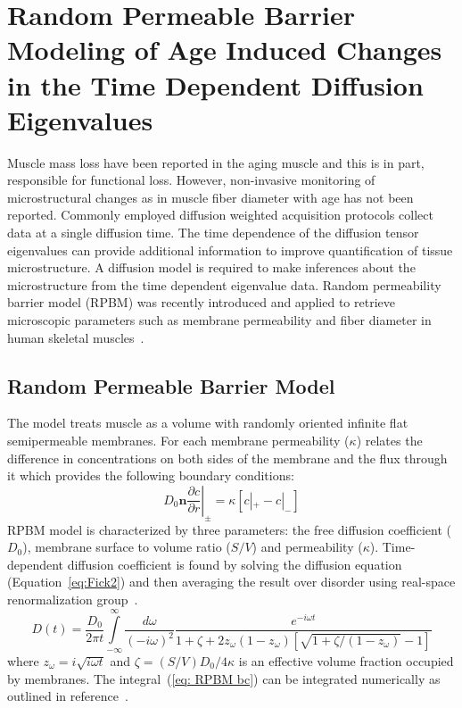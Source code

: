\section{Random Permeable Barrier Modeling of Age Induced Changes in the Time Dependent Diffusion Eigenvalues}
\label{sec: STEAM RPBM}
Muscle mass loss have been reported in the aging muscle and this is in part, responsible for functional loss. 
However, non-invasive monitoring of microstructural changes as in muscle fiber diameter with age has not been reported. 
Commonly employed diffusion weighted acquisition protocols collect data at a single diffusion time. 
The time dependence of the diffusion tensor eigenvalues can provide additional information to improve quantification of tissue microstructure. 
A diffusion model is required to make inferences about the microstructure from the time dependent eigenvalue data.
Random permeability barrier model (RPBM) was recently introduced and applied to retrieve microscopic parameters such as membrane permeability and fiber diameter in human skeletal muscles~\cite{NovikovRPBM, RND13}. 
\subsection{Random Permeable Barrier Model}
The model treats muscle as a volume with randomly oriented infinite flat semipermeable membranes. 
For each membrane permeability ($\kappa$) relates the difference in concentrations on both sides of the membrane and the flux through it which provides the following boundary conditions:
\begin{equation}\label{eq: RPBM bc}
D_0\mathbf{n}\left.\frac{\partial{c}}{\partial r} \right\vert_{\pm} = \kappa \left[ c|_+ - c|_-  \right]
\end{equation}
RPBM model is characterized by three parameters: the free diffusion coefficient ($D_0$), membrane surface to volume ratio ($S/V$) and permeability ($\kappa$). Time-dependent diffusion coefficient is found by solving the diffusion equation (Equation~\ref{eq:Fick2}) and then averaging the result over disorder using real-space renormalization group~\cite{NovikovRPBM}.
\begin{equation}\label{eq: RPBM}
D(t) = \frac{D_0}{2\pi t}\int\limits^{\infty}_{-\infty}\dfrac{d\omega}{(-i\omega)^2}\frac{e^{-i\omega t}}{1 + \zeta +2z_{\omega}(1-z_{\omega})  \left[\sqrt{1+\zeta/\left(1-z_{\omega}\right)}-1 \right] }
\end{equation}
where $z_\omega = i \sqrt{i \omega t}$ and $\zeta=(S/V)D_0/4\kappa$ is an effective volume fraction occupied by membranes.
The integral~(\ref{eq: RPBM bc}) can be integrated numerically as outlined in reference~\cite{RND13}.
